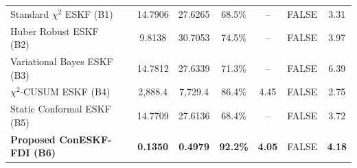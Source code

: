 \begin{table}[t]
{\begin{tabular}{llcccccc}
Standard $\chi^2$ ESKF (B1) & & 14.7906 & 27.6265 & 68.5\% & -- & FALSE & 3.31 \\
Huber Robust ESKF (B2) & & 9.8138 & 30.7053 & 74.5\% & -- & FALSE & 3.97 \\
Variational Bayes ESKF (B3) & & 14.7812 & 27.6339 & 71.3\% & -- & FALSE & 6.39 \\
$\chi^2$-CUSUM ESKF (B4) & & 2,888.4 & 7,729.4 & 86.4\% & 4.45 & FALSE & 2.75 \\
Static Conformal ESKF (B5) & & 14.7709 & 27.6136 & 68.4\% & -- & FALSE & 3.72 \\
\textbf{Proposed ConESKF-FDI (B6)} & & \textbf{0.1350} & \textbf{0.4979} & \textbf{92.2\%} & \textbf{4.05} & FALSE & \textbf{4.18} \\
\bottomrule
\end{tabular}%
}
\end{table}
